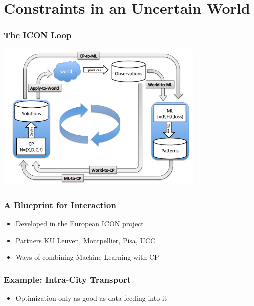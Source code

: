 \section{Constraints in an Uncertain World}

\begin{frame}
  \frametitle{The ICON Loop}
  \includegraphics[width=10cm]{../methodology/iconloop}
\end{frame}

\begin{frame}
  \frametitle{A Blueprint for Interaction}
  \begin{itemize}
  \item Developed in the European ICON project
  \item Partners KU Leuven, Montpellier, Pisa, UCC
    \item Ways of combining Machine Learning with CP
  \end{itemize}
\end{frame}

\begin{frame}
  \frametitle{Example: Intra-City Transport}
  \noindent\begin{itemize}
  \item Optimization only as good as data feeding into it
    \end{itemize}
\end{frame}

